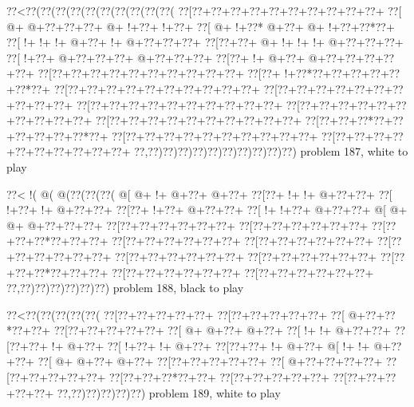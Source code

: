 \vbox{\vbox{\goo
\0??<\0??(\0??(\0??(\0??(\0??(\0??(\0??(\0??(\0??(\0??(
\0??[\0??+\0??+\0??+\0??+\0??+\0??+\0??+\0??+\0??+\0??+
\0??[\- @+\- @+\0??+\0??+\0??+\- @+\- !+\0??+\- !+\0??+
\0??[\- @+\- !+\0??*\- @+\0??+\- @+\- !+\0??+\0??*\0??+
\0??[\- !+\- !+\- !+\- @+\0??+\- !+\- @+\0??+\0??+\0??+
\0??[\0??+\0??+\- @+\- !+\- !+\- !+\- @+\0??+\0??+\0??+
\0??[\- !+\0??+\- @+\0??+\0??+\0??+\- @+\0??+\0??+\0??+
\0??[\0??+\- !+\- @+\0??+\- @+\0??+\0??+\0??+\0??+\0??+
\0??[\0??+\0??+\0??+\0??+\0??+\0??+\0??+\0??+\0??+\0??+
\0??[\0??+\- !+\0??*\0??+\0??+\0??+\0??+\0??+\0??*\0??+
\0??[\0??+\0??+\0??+\0??+\0??+\0??+\0??+\0??+\0??+\0??+
\0??[\0??+\0??+\0??+\0??+\0??+\0??+\0??+\0??+\0??+\0??+
\0??[\0??+\0??+\0??+\0??+\0??+\0??+\0??+\0??+\0??+\0??+
\0??[\0??+\0??+\0??+\0??+\0??+\0??+\0??+\0??+\0??+\0??+
\0??[\0??+\0??+\0??+\0??+\0??+\0??+\0??+\0??+\0??+\0??+
\0??[\0??+\0??+\0??*\0??+\0??+\0??+\0??+\0??+\0??*\0??+
\0??[\0??+\0??+\0??+\0??+\0??+\0??+\0??+\0??+\0??+\0??+
\0??[\0??+\0??+\0??+\0??+\0??+\0??+\0??+\0??+\0??+\0??+
\0??,\0??)\0??)\0??)\0??)\0??)\0??)\0??)\0??)\0??)\0??)
}
\hfil problem 187, white to play\hfil\break
}

\vbox{\vbox{\goo
\0??<\- !(\- @(\- @(\0??(\0??(\0??(
\- @[\- @+\- !+\- @+\0??+\- @+\0??+
\0??[\0??+\- !+\- !+\- @+\0??+\0??+
\0??[\- !+\0??+\- !+\- @+\0??+\0??+
\0??[\0??+\- !+\0??+\- @+\0??+\0??+
\0??[\- !+\- !+\0??+\- @+\0??+\0??+
\- @[\- @+\- @+\- @+\0??+\0??+\0??+
\0??[\0??+\0??+\0??+\0??+\0??+\0??+
\0??[\0??+\0??+\0??+\0??+\0??+\0??+
\0??[\0??+\0??+\0??*\0??+\0??+\0??+
\0??[\0??+\0??+\0??+\0??+\0??+\0??+
\0??[\0??+\0??+\0??+\0??+\0??+\0??+
\0??[\0??+\0??+\0??+\0??+\0??+\0??+
\0??[\0??+\0??+\0??+\0??+\0??+\0??+
\0??[\0??+\0??+\0??+\0??+\0??+\0??+
\0??[\0??+\0??+\0??*\0??+\0??+\0??+
\0??[\0??+\0??+\0??+\0??+\0??+\0??+
\0??[\0??+\0??+\0??+\0??+\0??+\0??+
\0??,\0??)\0??)\0??)\0??)\0??)\0??)
}
\hfil problem 188, black to play\hfil\break
}

\vbox{\vbox{\goo
\0??<\0??(\0??(\0??(\0??(\0??(
\0??[\0??+\0??+\0??+\0??+\0??+
\0??[\0??+\0??+\0??+\0??+\0??+
\0??[\- @+\0??+\0??*\0??+\0??+
\0??[\0??+\0??+\0??+\0??+\0??+
\0??[\- @+\- @+\0??+\- @+\0??+
\0??[\- !+\- !+\- @+\0??+\0??+
\0??[\0??+\0??+\- !+\- @+\0??+
\0??[\- !+\0??+\- !+\- @+\0??+
\0??[\0??+\0??+\- !+\- @+\0??+
\- @[\- !+\- !+\- @+\0??+\0??+
\0??[\- @+\- @+\0??+\- @+\0??+
\0??[\0??+\0??+\0??+\0??+\0??+
\0??[\- @+\0??+\0??+\0??+\0??+
\0??[\0??+\0??+\0??+\0??+\0??+
\0??[\0??+\0??+\0??*\0??+\0??+
\0??[\0??+\0??+\0??+\0??+\0??+
\0??[\0??+\0??+\0??+\0??+\0??+
\0??,\0??)\0??)\0??)\0??)\0??)
}
\hfil problem 189, white to play\hfil\break
}

